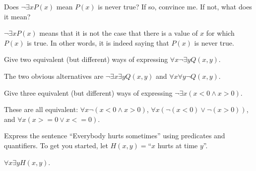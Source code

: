 \begin{requ}
Does $\neg\exists x P(x)$ mean $P(x)$ is never true? If so, convince me. If not, what does it mean?
\begin{requanswer}
$\neg\exists x P(x)$ means that it is not the case that there is a value of $x$ for which $P(x)$ is true.
In other words, it is indeed saying that $P(x)$ is never true.
\end{requanswer}
\end{requ}

\begin{requ}
Give two equivalent (but different) ways of expressing $\forall x \neg \exists y Q(x,y)$.
\begin{requanswer}
The two obvious alternatives are 
$\neg\exists x  \exists y Q(x,y)$ and
$\forall x \forall y\neg  Q(x,y)$.
\end{requanswer}
\end{requ}

\begin{requ}
Give three equivalent (but different) ways of expressing $\neg \exists x  (x<0 \wedge x>0)$.
\begin{requanswer}
These are all equivalent: $ \forall x  \neg(x<0 \wedge x>0)$,
$ \forall x  (\neg(x<0) \vee  \neg(x>0))$, and
$ \forall x  (x>=0 \vee  x<=0)$.
\end{requanswer}
\end{requ}

\begin{requ}
Express the sentence ``Everybody hurts sometimes'' using predicates and quantifiers.
To get you started, let $H(x,y)=$``$x$ hurts at time $y$''.
\begin{requanswer}
$\forall x\exists y H(x,y)$.
\end{requanswer}
\end{requ}


